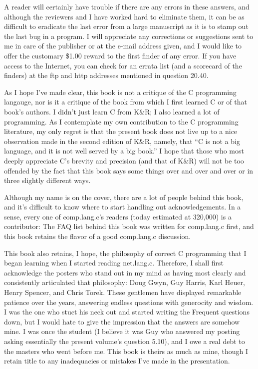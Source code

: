 A reader will certainly have trouble if there are any errors in these answers,
and although the reviewers and I have worked hard to eliminate them, it can
be as difficult to eradicate the last error from a large manuscript as it is to
stamp out the last bug in a program.  I will appreciate any corrections or
suggestions sent to me in care of the publisher or at the e-mail address given,
and I would like to offer the customary \$1.00 reward to the first finder of
any error.  If you have access to the Internet, you can check for an errata list
(and a scorecard of the finders) at the ftp and http addresses mentioned in
question 20.40.

As I hope I've made clear, this book is not a critique of the C programming
langauge, nor is it a critique of the book from which I first learned C or of
that book's authors.  I didn't just learn C from K\&R; I also learned a lot of
programming.  As I contemplate my own contribution to the C programming
literature, my only regret is that the present book does not live up to a nice
observation made in the second edition of K\&R, namely, that ``C is not a big
language, and it is not well served by a big book.''  I hope that those who
most deeply appreciate C's brevity and precision (and that of K\&R) will not be
too offended by the fact that this book says some things over and over and over
or in three slightly different ways.

Although my name is on the cover, there are a lot of people behind this book,
and it's difficult to know where to start handling out acknowledgements.
In a sense, every one of comp.lang.c's readers (today estimated at 320,000) is
a contributor:  The FAQ list behind this book was written for comp.lang.c first,
and this book retains the flavor of a good comp.lang.c discussion.

This book also retains, I hope, the philosophy of correct C programming that I
began learning when I started reading net.lang.c.  Therefore, I shall first
acknowledge the posters who stand out in my mind as having most clearly and
consistently articulated that philosophy: Doug Gwyn, Guy Harris, Karl Heuer,
Henry Spencer, and Chris Torek.  These gentlemen have displayed remarkable
patience over the years, answering endless questions with generocity and wisdom.
I was the one who stuct his neck out and started writing the Frequent questions
down, but I would hate to give the impression that the answers are somehow mine.
I was once the student (I believe it was Guy who answered my posting asking
essentially the present volume's question 5.10), and I owe a real debt to the
masters who went before me.  This book is theirs as much as mine, though I
retain title to any inadequacies or mistakes I've made in the presentation.

